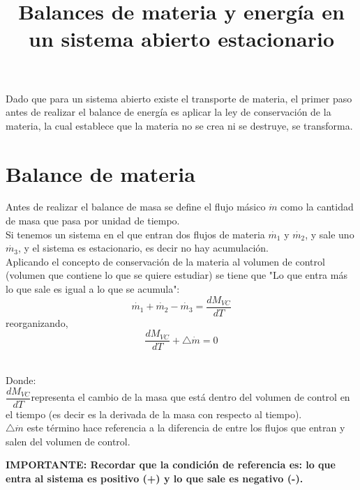 \documentclass{article}
\title{\textbf{Balances de materia y energ\'ia en un sistema abierto estacionario}}
\begin{document}
\date{}
\maketitle

\begin{center}
Dado que para un sistema abierto existe el transporte de materia, el primer paso antes de realizar el balance de energía es aplicar la ley de conservación de la materia, la cual establece que la materia no se crea ni se destruye, se transforma.
\end{center}



\section{Balance de materia}
Antes de realizar el balance de masa se define el flujo másico $\dot{m} $ como la cantidad de masa que pasa por unidad de tiempo.\\ 

Si tenemos un sistema en el que entran dos flujos de materia $\dot{m_{1}} $ y  $\dot{m_{2}} $, y sale uno $\dot{m_{3}} $, y el sistema es estacionario, es decir no hay acumulaci\'on. \\

Aplicando el concepto de conservación de la materia al volumen de control (volumen que contiene lo que se quiere estudiar) se tiene  que "Lo que entra m\'as lo que sale es igual a lo que se acumula":
\begin{equation}
\dot{m_{1}} + \dot{m_{2}} -\dot{m_{3}} = \dfrac{dM_{VC}}{dT}
\end{equation}
reorganizando,
\begin{equation}
\dfrac{dM_{VC}}{dT} + \bigtriangleup \dot{m} = 0
\end{equation}
\\
\begin{footnotesize}

Donde:\\

$ \dfrac{dM_{VC}}{dT} $representa el cambio de la masa que está dentro del volumen de control en el tiempo (es decir   es la derivada de la masa con respecto al tiempo).\\

$ \bigtriangleup \dot{m} $ este término hace referencia a la diferencia de entre los flujos que entran y salen del volumen de control. \\

\end{footnotesize}
\begin{center}
\textbf{IMPORTANTE: Recordar que la condición de referencia es: lo que entra al sistema es positivo (+) y lo que sale es negativo (-).}
\end{center}
\end{document}
